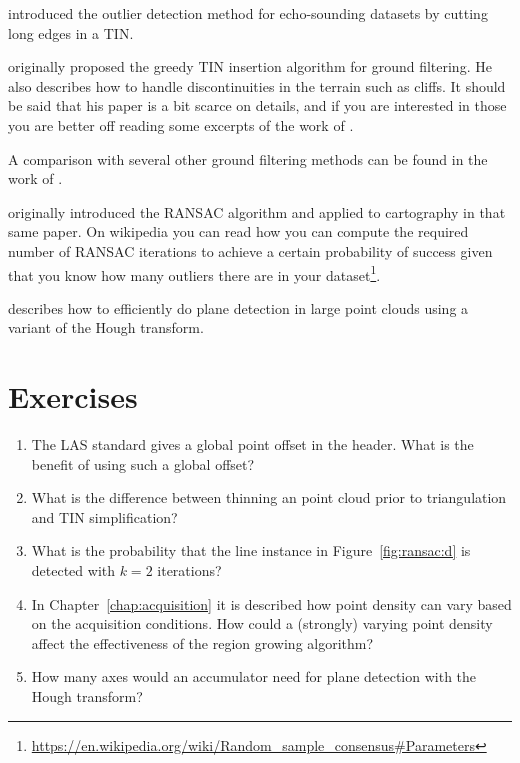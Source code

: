 \citet{Arge10} introduced the outlier detection method for echo-sounding datasets by cutting long edges in a TIN.

\citet{axelsson2000generation} originally proposed the greedy TIN insertion algorithm for ground filtering.
He also describes how to handle discontinuities in the terrain such as cliffs.
It should be said that his paper is a bit scarce on details, and if you are interested in those you are better off reading some excerpts of the work of \citet{Lin14}. 

A comparison with several other ground filtering methods can be found in the work of \citet{Meng10}.

\citet{Fischler81} originally introduced the RANSAC algorithm and applied to cartography in that same paper. On wikipedia you can read how you can compute the required number of RANSAC iterations to achieve a certain probability of success given that you know how many outliers there are in your dataset\footnote{\url{https://en.wikipedia.org/wiki/Random_sample_consensus\#Parameters}}.

\citet{Limberger15} describes how to efficiently do plane detection in large point clouds using a variant of the Hough transform.

%
\section{Exercises}


\begin{enumerate}
   \item The LAS standard gives a global point offset in the header. What is the benefit of using such a global offset?  
   \item What is the difference between thinning an point cloud prior to triangulation and TIN simplification?
  \item What is the probability that the line instance in Figure~\ref{fig:ransac:d} is detected with $k=2$ iterations?
  \item In Chapter~\ref{chap:acquisition} it is described how point density can vary based on the acquisition conditions. How could a (strongly) varying point density affect the effectiveness of the region growing algorithm?
  \item How many axes would an accumulator need for plane detection with the Hough transform?

\end{enumerate}
